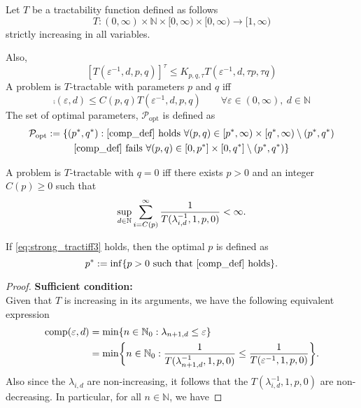 \documentclass[11pt,a4paper]{article}
\newcommand{\kachi}[1]{\begingroup\color{ForestGreen}#1\endgroup}
\begin{document}
\kachi{
Let $T$ be a tractability function defined as follows
\[
T :(0,\infty) \times \mathbb{N} \times [0,\infty) \times [0,\infty) \rightarrow [1,\infty)
\] 
strictly increasing in all variables.

Also,
\[
[T(\varepsilon^{-1},d,p,q)]^\tau \le K_{p,q,\tau} T(\varepsilon^{-1},d,\tau p,\tau q)
\]
A problem is $T$-tractable with parameters $p$ and $q$ iff
\begin{equation} \label{comp_def}
\comp(\varepsilon,d) \le C(p,q) T(\varepsilon^{-1},d,p,q) \qquad \forall \varepsilon \in (0,\infty), \ d \in \mathbb{N}
\end{equation}
The  set of optimal parameters, $\mathcal{P}_{\text{opt}}$ is defined as
\begin{multline}
    \mathcal{P}_{\text{opt}} : = \{(p^*,q^*) : \eqref{comp_def} \text{ holds }\forall (p,q) \in [p^*,\infty) \times [q^*,\infty) \setminus (p^*,q^*) \\ 
    \eqref{comp_def} \text{ fails } \forall (p,q) \in [0,p^*] \times [0,q^*] \setminus (p^*,q^*) \}
\end{multline}






\begin{theorem}\label{thm_main_tract2} 
A problem is $T$-tractable with $q=0$ iff there exists $p>0$ and an integer $C(p) \ge 0$ such that
\begin{equation} \label{eq:strong_tractiff3}
     \sup_{d \in \mathbb{N}} \sum_{i = C(p)}^\infty \frac{1}{T(\lambda_{i,d}^{-1},1,p,0)} < \infty.
\end{equation}
\end{theorem}

If \eqref{eq:strong_tractiff3} holds, then the optimal $p$
is defined as
\[
 p^* := \inf\{p>0\ \mbox{such that \eqref{comp_def} holds}\}.
\]
\bigskip
\begin{proof}
\textbf{Sufficient condition:}\\
Given that $T$ is increasing in its arguments, we have the following equivalent expression 
    \begin{align*}
    \operatorname{comp}(\varepsilon, d) &= \min \{n \in \mathbb{N}_{0} : \lambda_{n+1, d} \le \varepsilon\} \\
    &= \min \biggl\{n \in \mathbb{N}_{0} : \frac{1}{T(\lambda_{n+1,d}^{-1},1,p,0)}\le \frac{1}{T(\varepsilon^{-1},1,p,0) }\biggr\}.
\end{align*}
Also since the $\lambda_{i,d}$ are non-increasing, it follows that the $T(\lambda_{i,d}^{-1},1,p,0)$ are non-decreasing. In particular, for all $n\in \mathbb{N}$, we have


\end{proof}}
\end{document}

